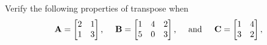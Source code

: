         Verify the following properties of transpose when
        \[
            \bold{A} = \begin{bmatrix}
                2 & 1 \\
                1 & 3
            \end{bmatrix}\text{,}\hspace{0.2in}
            \bold{B} = \begin{bmatrix}
                1 & 4 & 2 \\
                5 & 0 & 3
            \end{bmatrix}\text{,}\hspace{0.2in}\text{and}\hspace{0.2in}
            \bold{C} = \begin{bmatrix}
                1 & 4 \\
                3 & 2
            \end{bmatrix},
        \]
